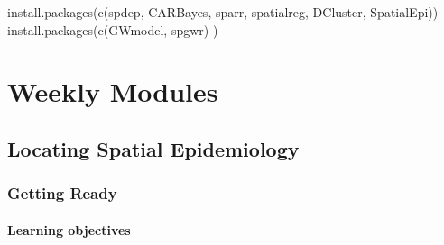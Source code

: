 \documentclass[
]{book}
\newenvironment{Shaded}{\begin{snugshade}}{\end{snugshade}}
\newcommand{\FunctionTok}[1]{\textcolor[rgb]{0.00,0.00,0.00}{#1}}
\newcommand{\NormalTok}[1]{#1}
\newcommand{\StringTok}[1]{\textcolor[rgb]{0.31,0.60,0.02}{#1}}
\begin{document}
\begin{Shaded}
\begin{Highlighting}[]
\FunctionTok{install.packages}\NormalTok{(}\FunctionTok{c}\NormalTok{(}\StringTok{\textquotesingle{}spdep\textquotesingle{}}\NormalTok{, }\StringTok{\textquotesingle{}CARBayes\textquotesingle{}}\NormalTok{, }\StringTok{\textquotesingle{}sparr\textquotesingle{}}\NormalTok{, }\StringTok{\textquotesingle{}spatialreg\textquotesingle{}}\NormalTok{,  }\StringTok{\textquotesingle{}DCluster\textquotesingle{}}\NormalTok{, }\StringTok{\textquotesingle{}SpatialEpi\textquotesingle{}}\NormalTok{))}
\FunctionTok{install.packages}\NormalTok{(}\FunctionTok{c}\NormalTok{(}\StringTok{\textquotesingle{}GWmodel\textquotesingle{}}\NormalTok{, }\StringTok{\textquotesingle{}spgwr\textquotesingle{}}\NormalTok{) )}
\end{Highlighting}
\end{Shaded}

\hypertarget{part-weekly-modules}{%
\part{Weekly Modules}\label{part-weekly-modules}}

\hypertarget{locating-spatial-epidemiology}{%
\chapter{Locating Spatial Epidemiology}\label{locating-spatial-epidemiology}}

\hypertarget{getting-ready}{%
\section{Getting Ready}\label{getting-ready}}

\hypertarget{learning-objectives}{%
\subsection{Learning objectives}\label{learning-objectives}}

 
  \providecommand{\huxb}[2]{\arrayrulecolor[RGB]{#1}\global\arrayrulewidth=#2pt}
  \providecommand{\huxvb}[2]{\color[RGB]{#1}\vrule width #2pt}
  \providecommand{\huxtpad}[1]{\rule{0pt}{#1}}
  \providecommand{\huxbpad}[1]{\rule[-#1]{0pt}{#1}}
\end{document}
